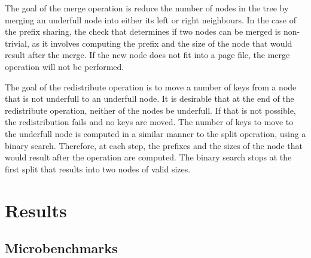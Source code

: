 \documentclass[11pt,a4paper,oneside]{article}
\begin{document}
The goal of the merge operation is reduce the number of nodes in the tree by merging an underfull node into either its left or right neighbours. In the case of the prefix sharing, the check that determines if two nodes can be merged is non-trivial, as it involves computing the prefix and the size of the node that would result after the merge. If the new node does not fit into a page file, the merge operation will not be performed.

The goal of the redistribute operation is to move a number of keys from a node that is not underfull to an underfull node. It is desirable that at the end of the redistribute operation, neither of the nodes be underfull. If that is not possible, the redistribution fails and no keys are moved. The number of keys to move to the underfull node is computed in a similar manner to the split operation, using a binary search. Therefore, at each step, the prefixes and the sizes of the node that would result after the operation are computed. The binary search stops at the first split that results into two nodes of valid sizes.


\section{Results}
\subsection{Microbenchmarks} %
\label{sub:microbenchmarks}
\end{document}
